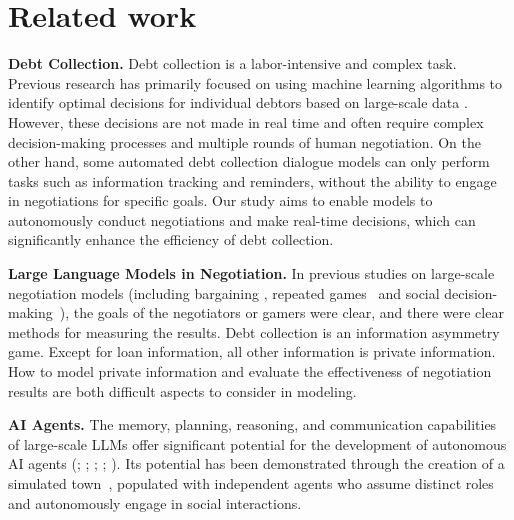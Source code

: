 \section{Related work}

\textbf{Debt Collection. }Debt collection is a labor-intensive and complex task. Previous research has primarily focused on using machine learning algorithms to identify optimal decisions for individual debtors based on large-scale data  \citep{Sancarlos2023TowardsAD,Jankowski2024DebtCM,Johan2022FinancialTC,Onar2019ADS}. However, these decisions are not made in real time and often require complex decision-making processes and multiple rounds of human negotiation. On the other hand, some automated debt collection dialogue models \citep{Floatbot2023GenerativeAI,Yahiya2024AutomatedDR} can only perform tasks such as information tracking and reminders, without the ability to engage in negotiations for specific goals. Our study aims to enable models to autonomously conduct negotiations and make real-time decisions, which can significantly enhance the efficiency of debt collection.

\textbf{Large Language Models in Negotiation. }In previous studies on large-scale negotiation models (including bargaining \citep{xia2024measuringbargainingabilitiesllms}, repeated games~\citep{akata2023playingrepeatedgameslarge,fu2023improvinglanguagemodelnegotiation} and social decision-making~\citep{10.5555/3618408.3619525}), the goals of the negotiators or gamers were clear, and there were clear methods for measuring the results. Debt collection is an information asymmetry game. Except for loan information, all other information is private information. How to model private information and evaluate the effectiveness of negotiation results are both difficult aspects to consider in modeling.

\textbf{AI Agents. }The memory, planning, reasoning, and communication capabilities of large-scale LLMs offer significant potential for the development of autonomous AI agents (\citealp{autogpt}; \citealp{park2023generative}; \citealp{liang2023encouraging};  \citealp{10.1162/tacl_a_00642}; \citealp{wang2025largelanguagemodelstruly}). Its potential has been demonstrated through the creation of a simulated town~\citep{park2023generative}, populated with independent agents who assume distinct roles and autonomously engage in social interactions.



